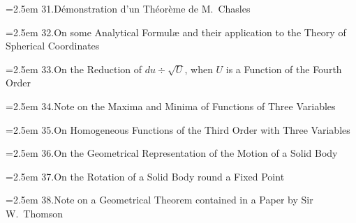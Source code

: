 \documentclass[11pt]{article}
\begin{document}
\noindent\hangindent=2.5em
31.\quad D\'emonstration d'un Th\'eor\`eme de M.\ Chasles\par
\hspace{1.5em}{\small Liouville, t.~x.\ (1845), pp.~383, 384}\par

\noindent\hangindent=2.5em
32.\quad On some Analytical Formul\ae{} and their application to the Theory of Spherical Coordinates\par
\hspace{1.5em}{\small Camb.\ and Dubl.\ Math.\ Jour.\ t.~i.\ (1846), pp.~22--33}\par

\noindent\hangindent=2.5em
33.\quad On the Reduction of $du \div \sqrt{U}$, when $U$ is a Function of the Fourth Order\par
\hspace{1.5em}{\small Camb.\ and Dubl.\ Math.\ Jour.\ t.~i.\ (1846), pp.~70--73}\par

\noindent\hangindent=2.5em
34.\quad Note on the Maxima and Minima of Functions of Three Variables\par
\hspace{1.5em}{\small Camb.\ and Dubl.\ Math.\ Jour.\ t.~i.\ (1846), pp.~74, 75}\par

\noindent\hangindent=2.5em
35.\quad On Homogeneous Functions of the Third Order with Three Variables\par
\hspace{1.5em}{\small Camb.\ and Dubl.\ Math.\ Jour.\ t.~i.\ (1846), pp.~97--104}\par

\noindent\hangindent=2.5em
36.\quad On the Geometrical Representation of the Motion of a Solid Body\par
\hspace{1.5em}{\small Camb.\ and Dubl.\ Math.\ Jour.\ t.~i.\ (1846), pp.~164--167}\par

\noindent\hangindent=2.5em
37.\quad On the Rotation of a Solid Body round a Fixed Point\par
\hspace{1.5em}{\small Camb.\ and Dubl.\ Math.\ Jour.\ t.~i.\ (1846), pp.~167--173 and 264--274}\par

\noindent\hangindent=2.5em
38.\quad Note on a Geometrical Theorem contained in a Paper by Sir W.\ Thomson\par
\hspace{1.5em}{\small Camb.\ and Dubl.\ Math.\ Jour.\ t.~i.\ (1846), pp.~207, 208}\par
\end{document}
